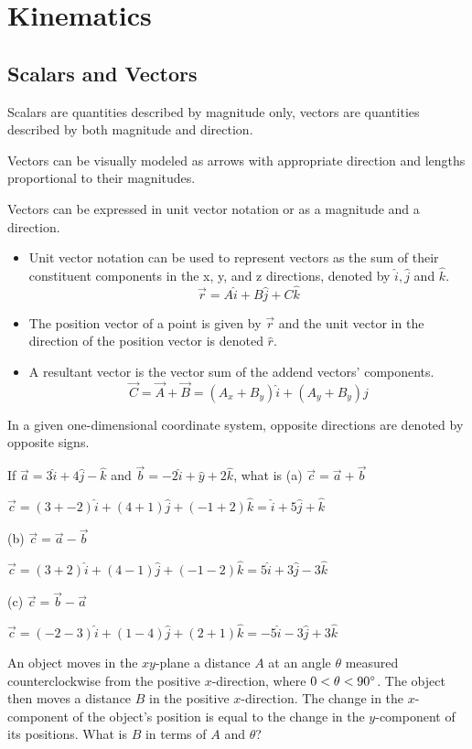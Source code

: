 \documentclass[../mech.tex]{subfiles}
\begin{document}
\chapter{Kinematics}
\section{Scalars and Vectors}
Scalars are quantities described by magnitude only, vectors are quantities described by both magnitude and direction.

Vectors can be visually modeled as arrows with appropriate direction and lengths proportional to their magnitudes.

Vectors can be expressed in unit vector notation or as a magnitude and a direction.
\begin{itemize}
    \item Unit vector notation can be used to represent vectors as the sum of their constituent components in the x, y, and z directions, denoted by $\hat{i}, \hat{j}$ and $\hat{k}$.
    \[ \vec{r} = A\hat{i}+B\hat{j}+C\hat{k}\]
    \item The position vector of a point is given by $\vec{r}$ and the unit vector in the direction of the position vector is denoted $\hat{r}$.
    \item A resultant vector is the vector sum of the addend vectors' components. 
    \[ \vec{C}=\vec{A}+\vec{B}=(A_x+B_y)\hat{i}+(A_y+B_y)\hat{j} \]
\end{itemize}

In a given one-dimensional coordinate system, opposite directions are denoted by opposite signs.

\begin{example}
    If $\vec{a}=3\hat{i}+4\hat{j}-\hat{k}$ and $\vec{b}=-2\hat{i}+\hat{y}+2\hat{k}$, what is 
    (a) $\vec{c}=\vec{a}+\vec{b}$

    $\vec{c}=(3+-2)\hat{i}+(4+1)\hat{j}+(-1+2)\hat{k}=\hat{i}+5\hat{j}+\hat{k}$

    (b) $\vec{c}=\vec{a}-\vec{b}$

    $\vec{c}=(3+2)\hat{i}+(4-1)\hat{j}+(-1-2)\hat{k}=5\hat{i}+3\hat{j}-3\hat{k}$

    (c) $\vec{c}=\vec{b}-\vec{a}$

    $\vec{c}=(-2-3)\hat{i}+(1-4)\hat{j}+(2+1)\hat{k}=-5\hat{i}-3\hat{j}+3\hat{k}$
\end{example}

\ex An object moves in the $xy$-plane a distance $A$ at an angle $\theta$ measured counterclockwise from the positive $x$-direction, where $0<\theta<90\degree$. The object then moves a 
distance $B$ in the positive $x$-direction. The change in the $x$-component of the object's position is equal to the change in the $y$-component of its positions. What is $B$ in terms of $A$ and $\theta$?
\end{document}
